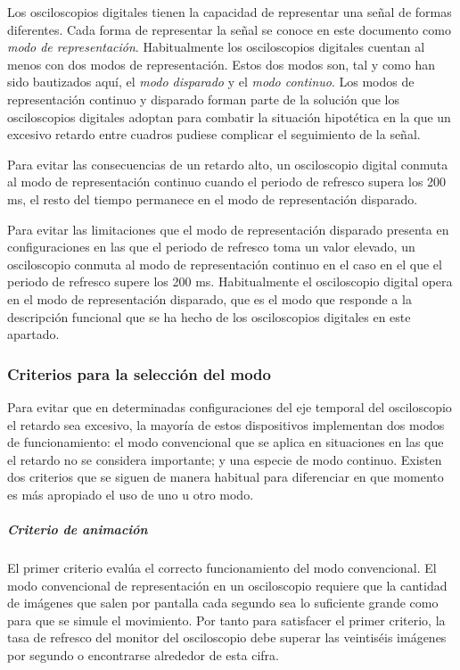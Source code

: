 Los osciloscopios digitales tienen la capacidad de representar una señal de
formas diferentes. Cada forma de representar la señal se conoce en este
documento como \emph{modo de representación}. Habitualmente los
osciloscopios digitales cuentan al menos con dos modos de representación.
Estos dos modos son, tal y como han sido bautizados aquí, el \emph{modo
disparado} y el \emph{modo continuo}. Los modos de representación continuo
y disparado forman parte de la solución que los osciloscopios digitales
adoptan para combatir la situación hipotética en la que un excesivo retardo
entre cuadros pudiese complicar el seguimiento de la señal.

Para evitar las consecuencias de un retardo alto, un osciloscopio digital
conmuta al modo de representación continuo cuando el periodo de refresco
supera los 200 ms, el resto del tiempo permanece en el modo de
representación disparado. %

Para evitar las limitaciones que el modo de representación disparado
presenta en configuraciones en las que el periodo de refresco toma un valor
elevado, un osciloscopio conmuta al modo de representación continuo en el
caso en el que el periodo de refresco supere los 200 ms. Habitualmente el
osciloscopio digital opera en el modo de representación disparado, que es
el modo que responde a la descripción funcional que se ha hecho de los
osciloscopios digitales en este apartado.


\subsubsection{Criterios para la selección del modo}

Para evitar que en determinadas configuraciones del eje temporal del
osciloscopio el retardo sea excesivo, la mayoría de estos dispositivos
implementan dos modos de funcionamiento: el modo convencional que se aplica
en situaciones en las que el retardo no se considera importante; y una
especie de modo continuo. Existen dos criterios que se siguen de manera
habitual para diferenciar en que momento es más apropiado el uso de uno u
otro modo.


\subparagraph{Criterio de animación}

El primer criterio evalúa el correcto funcionamiento del modo convencional.
El modo convencional de representación en un osciloscopio requiere que la
cantidad de imágenes que salen por pantalla cada segundo sea lo suficiente
grande como para que se simule el movimiento. Por tanto para satisfacer el
primer criterio, la tasa de refresco del monitor del osciloscopio debe
superar las veintiséis imágenes por segundo o encontrarse alrededor de esta
cifra.


